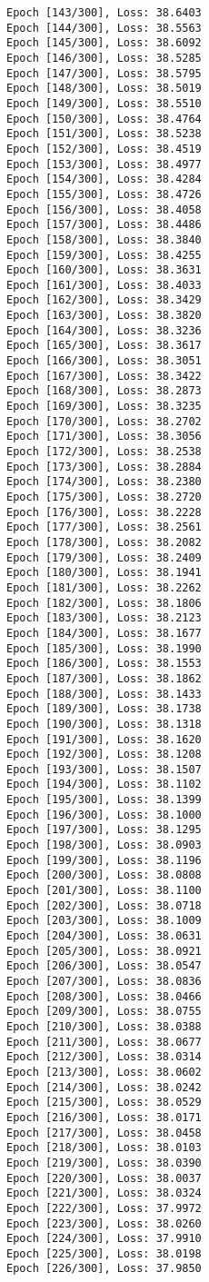 \documentclass[11pt]{article}
\begin{document}
\begin{Verbatim}[commandchars=\\\{\}]
Epoch [143/300], Loss: 38.6403
Epoch [144/300], Loss: 38.5563
Epoch [145/300], Loss: 38.6092
Epoch [146/300], Loss: 38.5285
Epoch [147/300], Loss: 38.5795
Epoch [148/300], Loss: 38.5019
Epoch [149/300], Loss: 38.5510
Epoch [150/300], Loss: 38.4764
Epoch [151/300], Loss: 38.5238
Epoch [152/300], Loss: 38.4519
Epoch [153/300], Loss: 38.4977
Epoch [154/300], Loss: 38.4284
Epoch [155/300], Loss: 38.4726
Epoch [156/300], Loss: 38.4058
Epoch [157/300], Loss: 38.4486
Epoch [158/300], Loss: 38.3840
Epoch [159/300], Loss: 38.4255
Epoch [160/300], Loss: 38.3631
Epoch [161/300], Loss: 38.4033
Epoch [162/300], Loss: 38.3429
Epoch [163/300], Loss: 38.3820
Epoch [164/300], Loss: 38.3236
Epoch [165/300], Loss: 38.3617
Epoch [166/300], Loss: 38.3051
Epoch [167/300], Loss: 38.3422
Epoch [168/300], Loss: 38.2873
Epoch [169/300], Loss: 38.3235
Epoch [170/300], Loss: 38.2702
Epoch [171/300], Loss: 38.3056
Epoch [172/300], Loss: 38.2538
Epoch [173/300], Loss: 38.2884
Epoch [174/300], Loss: 38.2380
Epoch [175/300], Loss: 38.2720
Epoch [176/300], Loss: 38.2228
Epoch [177/300], Loss: 38.2561
Epoch [178/300], Loss: 38.2082
Epoch [179/300], Loss: 38.2409
Epoch [180/300], Loss: 38.1941
Epoch [181/300], Loss: 38.2262
Epoch [182/300], Loss: 38.1806
Epoch [183/300], Loss: 38.2123
Epoch [184/300], Loss: 38.1677
Epoch [185/300], Loss: 38.1990
Epoch [186/300], Loss: 38.1553
Epoch [187/300], Loss: 38.1862
Epoch [188/300], Loss: 38.1433
Epoch [189/300], Loss: 38.1738
Epoch [190/300], Loss: 38.1318
Epoch [191/300], Loss: 38.1620
Epoch [192/300], Loss: 38.1208
Epoch [193/300], Loss: 38.1507
Epoch [194/300], Loss: 38.1102
Epoch [195/300], Loss: 38.1399
Epoch [196/300], Loss: 38.1000
Epoch [197/300], Loss: 38.1295
Epoch [198/300], Loss: 38.0903
Epoch [199/300], Loss: 38.1196
Epoch [200/300], Loss: 38.0808
Epoch [201/300], Loss: 38.1100
Epoch [202/300], Loss: 38.0718
Epoch [203/300], Loss: 38.1009
Epoch [204/300], Loss: 38.0631
Epoch [205/300], Loss: 38.0921
Epoch [206/300], Loss: 38.0547
Epoch [207/300], Loss: 38.0836
Epoch [208/300], Loss: 38.0466
Epoch [209/300], Loss: 38.0755
Epoch [210/300], Loss: 38.0388
Epoch [211/300], Loss: 38.0677
Epoch [212/300], Loss: 38.0314
Epoch [213/300], Loss: 38.0602
Epoch [214/300], Loss: 38.0242
Epoch [215/300], Loss: 38.0529
Epoch [216/300], Loss: 38.0171
Epoch [217/300], Loss: 38.0458
Epoch [218/300], Loss: 38.0103
Epoch [219/300], Loss: 38.0390
Epoch [220/300], Loss: 38.0037
Epoch [221/300], Loss: 38.0324
Epoch [222/300], Loss: 37.9972
Epoch [223/300], Loss: 38.0260
Epoch [224/300], Loss: 37.9910
Epoch [225/300], Loss: 38.0198
Epoch [226/300], Loss: 37.9850

\end{Verbatim}
\end{document}
